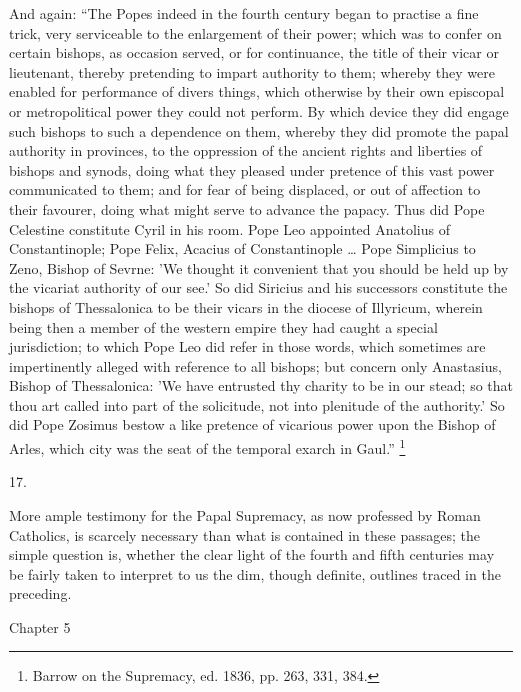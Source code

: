 And again: ``The Popes indeed in the fourth
century began to practise a fine trick, very serviceable
to the enlargement of their power; which was to confer on
certain bishops, as occasion served, or for continuance,
the title of their vicar or lieutenant, thereby
pretending to impart authority to them; whereby they were
enabled for performance of divers things, which otherwise
by their own episcopal or metropolitical power they could
not perform. By which device they did engage such bishops
to such a dependence on them, whereby they did promote
the papal authority in provinces, to the oppression of
the ancient rights and liberties of bishops and synods,
doing what they pleased under pretence of this vast power
communicated to them; and for fear of being displaced, or
out of affection to their favourer, doing what might
serve to advance the papacy. Thus did Pope Celestine
constitute Cyril in his room. Pope Leo appointed
Anatolius of Constantinople; Pope Felix, Acacius of
Constantinople … Pope Simplicius to Zeno, Bishop of
Sevrne: 'We thought it convenient that you should be held
up by the vicariat authority of our see.' So did Siricius
and his successors constitute the bishops of Thessalonica
to be their vicars in the diocese of Illyricum, wherein
being then a member of the western empire they had caught
a special jurisdiction; to which Pope Leo did refer in
those words, which sometimes are impertinently alleged
with reference to all bishops; but concern only
Anastasius, Bishop of Thessalonica: 'We have entrusted
thy charity to be in our stead; so that thou art called
into part of the solicitude, not into plenitude of the
authority.' So did Pope Zosimus bestow a like pretence of
vicarious power upon the Bishop of Arles, which city was
the seat of the temporal exarch in Gaul.'' \footnote{Barrow on the Supremacy, ed.
1836, pp. 263, 331, 384.}

17.

More ample testimony for the Papal Supremacy, as now professed by Roman Catholics, is scarcely necessary than
what is contained in these passages; the simple question
is, whether the clear light of the fourth and fifth
centuries may be fairly taken to interpret to us the dim,
though definite, outlines traced in the preceding.

Chapter 5


